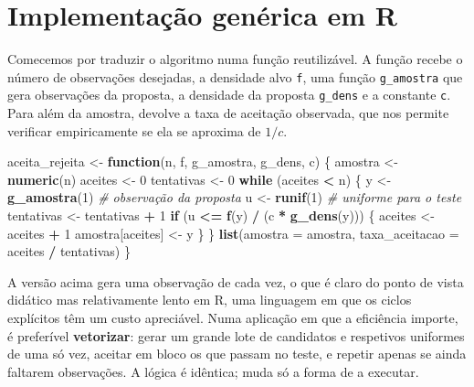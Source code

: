 \documentclass[
  portuguese,
  11pt,
  openany]{book}
\newenvironment{Shaded}{\begin{snugshade}}{\end{snugshade}}
\newcommand{\AttributeTok}[1]{\textcolor[rgb]{0.13,0.29,0.53}{#1}}
\newcommand{\CommentTok}[1]{\textcolor[rgb]{0.56,0.35,0.01}{\textit{#1}}}
\newcommand{\ControlFlowTok}[1]{\textcolor[rgb]{0.13,0.29,0.53}{\textbf{#1}}}
\newcommand{\DecValTok}[1]{\textcolor[rgb]{0.00,0.00,0.81}{#1}}
\newcommand{\FunctionTok}[1]{\textcolor[rgb]{0.13,0.29,0.53}{\textbf{#1}}}
\newcommand{\NormalTok}[1]{#1}
\newcommand{\OtherTok}[1]{\textcolor[rgb]{0.56,0.35,0.01}{#1}}
\newcommand{\SpecialCharTok}[1]{\textcolor[rgb]{0.81,0.36,0.00}{\textbf{#1}}}
\begin{document}
\section{Implementação genérica em R}\label{implementauxe7uxe3o-genuxe9rica-em-r}

Comecemos por traduzir o algoritmo numa função reutilizável. A função recebe o
número de observações desejadas, a densidade alvo \texttt{f}, uma função \texttt{g\_amostra}
que gera observações da proposta, a densidade da proposta \texttt{g\_dens} e a constante
\texttt{c}. Para além da amostra, devolve a taxa de aceitação observada, que nos
permite verificar empiricamente se ela se aproxima de \(1/c\).

\begin{Shaded}
\begin{Highlighting}[]
\NormalTok{aceita\_rejeita }\OtherTok{\textless{}{-}} \ControlFlowTok{function}\NormalTok{(n, f, g\_amostra, g\_dens, c) \{}
\NormalTok{  amostra    }\OtherTok{\textless{}{-}} \FunctionTok{numeric}\NormalTok{(n)}
\NormalTok{  aceites    }\OtherTok{\textless{}{-}} \DecValTok{0}
\NormalTok{  tentativas }\OtherTok{\textless{}{-}} \DecValTok{0}
  \ControlFlowTok{while}\NormalTok{ (aceites }\SpecialCharTok{\textless{}}\NormalTok{ n) \{}
\NormalTok{    y }\OtherTok{\textless{}{-}} \FunctionTok{g\_amostra}\NormalTok{(}\DecValTok{1}\NormalTok{)              }\CommentTok{\# observação da proposta}
\NormalTok{    u }\OtherTok{\textless{}{-}} \FunctionTok{runif}\NormalTok{(}\DecValTok{1}\NormalTok{)                  }\CommentTok{\# uniforme para o teste}
\NormalTok{    tentativas }\OtherTok{\textless{}{-}}\NormalTok{ tentativas }\SpecialCharTok{+} \DecValTok{1}
    \ControlFlowTok{if}\NormalTok{ (u }\SpecialCharTok{\textless{}=} \FunctionTok{f}\NormalTok{(y) }\SpecialCharTok{/}\NormalTok{ (c }\SpecialCharTok{*} \FunctionTok{g\_dens}\NormalTok{(y))) \{}
\NormalTok{      aceites }\OtherTok{\textless{}{-}}\NormalTok{ aceites }\SpecialCharTok{+} \DecValTok{1}
\NormalTok{      amostra[aceites] }\OtherTok{\textless{}{-}}\NormalTok{ y}
\NormalTok{    \}}
\NormalTok{  \}}
  \FunctionTok{list}\NormalTok{(}\AttributeTok{amostra =}\NormalTok{ amostra,}
       \AttributeTok{taxa\_aceitacao =}\NormalTok{ aceites }\SpecialCharTok{/}\NormalTok{ tentativas)}
\NormalTok{\}}
\end{Highlighting}
\end{Shaded}

A versão acima gera uma observação de cada vez, o que é claro do ponto de vista
didático mas relativamente lento em R, uma linguagem em que os ciclos explícitos
têm um custo apreciável. Numa aplicação em que a eficiência importe, é
preferível \textbf{vetorizar}: gerar um grande lote de candidatos e respetivos
uniformes de uma só vez, aceitar em bloco os que passam no teste, e repetir
apenas se ainda faltarem observações. A lógica é idêntica; muda só a forma de a
executar.
\end{document}
